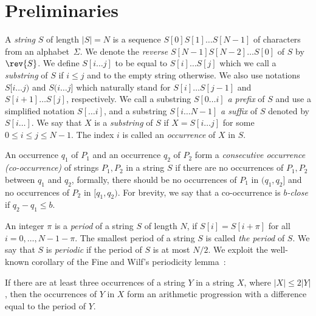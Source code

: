 \section{Preliminaries}
\label{indexgapped:sec:prelim}
A \emph{string} $S$ of length $|S| = N$ is a sequence $S[0]S[1]\dots S[N-1]$ of characters from an alphabet~$\Sigma$. We denote the \emph{reverse} $S[N-1] S[N-2] \ldots S[0]$ of $S$ by $\rev{S}$. We define $S[i \dots j]$ to be equal to $S[i] \dots S[j]$ which we call a \emph{substring} of $S$ if $i \le j$ and to the empty string otherwise. We also use notations $S[i \dots j)$ and $S(i\dots j]$ which naturally stand for $S[i] \dots S[j-1]$ and $S[i+1] \dots S[j]$, respectively. 
We call a substring $S[0 \dots i]$ \emph{a prefix} of $S$ and use a simplified notation $S[\dots i]$, and a substring $S[i \dots N-1]$ \emph{a suffix} of $S$ denoted by $S[i \dots]$. We say that $X$ is a \emph{substring} of $S$ if $X = S[i \dots j]$ for some $0 \le i \le j \le N-1$. The index $i$ is called an \emph{occurrence} of $X$ in $S$. 

An occurrence $q_1$ of $P_1$ and an occurrence $q_2$ of $P_2$ form a  \emph{consecutive occurrence (co-occurrence)} of strings $P_1,P_2$ in a string $S$ if there are no occurrences of $P_1,P_2$ between $q_1$ and $q_2$, formally, there should be no occurrences of $P_1$ in $(q_1,q_2]$ and no occurrences of $P_2$ in $[q_1,q_2)$. For brevity, we say that a co-occurrence is \emph{$b$-close} if $q_2-q_1 \le b$.  
 
An integer $\pi$ is a \emph{period} of a string $S$ of length $N$, if $S[i]=S[i+\pi]$ for all $i=0,\dots, N-1-\pi$. The smallest period of a string $S$ is called \emph{the period} of $S$. We say that $S$ is \emph{periodic} if  the period of $S$ is at most $N/2$. We exploit the well-known corollary of the Fine and Wilf's periodicity lemma~\cite{fine1965uniqueness}:


\begin{corollary}\label{cor:arithmetic_progression}
If there are at least three occurrences of a string $Y$ in a string $X$, where $|X| \le 2|Y|$, then the occurrences of $Y$ in $X$ form an arithmetic progression with a difference equal to the period of $Y$. 
\end{corollary}


